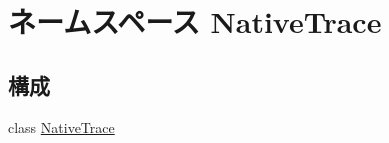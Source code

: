\hypertarget{namespaceNativeTrace}{
\section{ネームスペース NativeTrace}
\label{namespaceNativeTrace}
}
\subsection*{構成}
\begin{DoxyCompactItemize}
\item 
class \hyperlink{classNativeTrace_1_1NativeTrace}{NativeTrace}
\end{DoxyCompactItemize}
